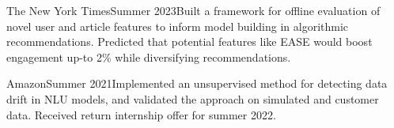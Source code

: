   {The New York Times}{Summer 2023}{}{Built a framework for offline evaluation of novel user and article features to inform model building in algorithmic recommendations. Predicted that potential features like EASE would boost engagement up-to 2\% while diversifying recommendations.}


  {Amazon}{Summer 2021}{}{Implemented an unsupervised method for detecting data drift in NLU models, and validated the approach on simulated and customer data. Received return internship offer for summer 2022.}
